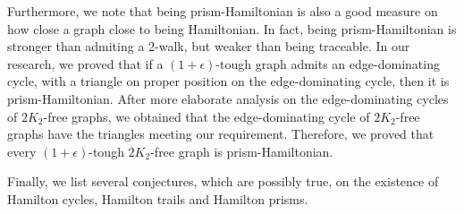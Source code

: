 \documentclass[12pt]{report}
\begin{document}
Furthermore, we note that being prism-Hamiltonian is also a good measure on how close a graph close to being Hamiltonian. In fact, being prism-Hamiltonian is stronger than admiting a 2-walk, but weaker than being traceable. In our research, we proved that if a $(1+\epsilon)$-tough graph admits an edge-dominating cycle, with a triangle on proper position on the edge-dominating cycle, then it is prism-Hamiltonian. After more elaborate analysis on the edge-dominating cycles of $2K_2$-free graphs, we obtained that the edge-dominating cycle of $2K_2$-free graphs have the triangles meeting our requirement. Therefore, we proved that every $(1+\epsilon)$-tough $2K_2$-free graph is prism-Hamiltonian.

Finally, we list several conjectures, which are possibly true, on the existence of Hamilton cycles, Hamilton trails and Hamilton prisms.




















\end{document}
